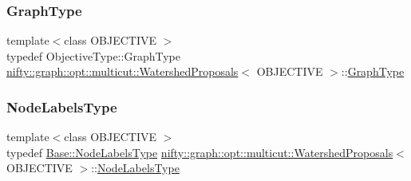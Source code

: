 \subsubsection{\texorpdfstring{Graph\+Type}{GraphType}}
{\footnotesize\ttfamily template$<$class O\+B\+J\+E\+C\+T\+I\+VE $>$ \\
typedef Objective\+Type\+::\+Graph\+Type \hyperlink{classnifty_1_1graph_1_1opt_1_1multicut_1_1WatershedProposals}{nifty\+::graph\+::opt\+::multicut\+::\+Watershed\+Proposals}$<$ O\+B\+J\+E\+C\+T\+I\+VE $>$\+::\hyperlink{classnifty_1_1graph_1_1opt_1_1multicut_1_1WatershedProposals_a1b552b5ad2f22af891c4e83fc3b324cf}{Graph\+Type}}

\mbox{\label{classnifty_1_1graph_1_1opt_1_1multicut_1_1WatershedProposals_a41e2d6c837cbe4d58aa4279419483723}} 
\subsubsection{\texorpdfstring{Node\+Labels\+Type}{NodeLabelsType}}
{\footnotesize\ttfamily template$<$class O\+B\+J\+E\+C\+T\+I\+VE $>$ \\
typedef \hyperlink{classnifty_1_1graph_1_1opt_1_1common_1_1SolverBase_abefd51561de2fd009f6bed6bef6009ea}{Base\+::\+Node\+Labels\+Type} \hyperlink{classnifty_1_1graph_1_1opt_1_1multicut_1_1WatershedProposals}{nifty\+::graph\+::opt\+::multicut\+::\+Watershed\+Proposals}$<$ O\+B\+J\+E\+C\+T\+I\+VE $>$\+::\hyperlink{classnifty_1_1graph_1_1opt_1_1multicut_1_1WatershedProposals_a41e2d6c837cbe4d58aa4279419483723}{Node\+Labels\+Type}}

\mbox{\label{classnifty_1_1graph_1_1opt_1_1multicut_1_1WatershedProposals_a2ea604fcb16dc28bf52164ec5b3f232a}} 
